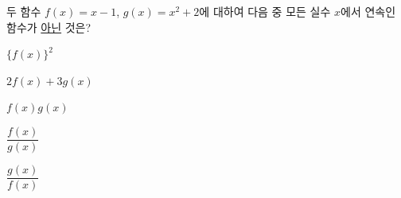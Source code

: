 두 함수 $f(x)=x-1$, $g(x)=x^2+2$에 대하여 다음 중 모든 실수 $x$에서 연속인 함수가 \underline{아닌} 것은?
\begin{choicesii}{\rule[-3ex]{0pt}{8ex}$\{f(x)\}^2$}{\rule[-3ex]{0pt}{8ex}$2f(x)+3g(x)$}{\rule[-3ex]{0pt}{8ex}$f(x)g(x)$}{\rule[-3ex]{0pt}{8ex}$\dfrac{f(x)}{g(x)}$}{\rule[-3ex]{0pt}{8ex}$\dfrac{g(x)}{f(x)}$}\end{choicesii}
